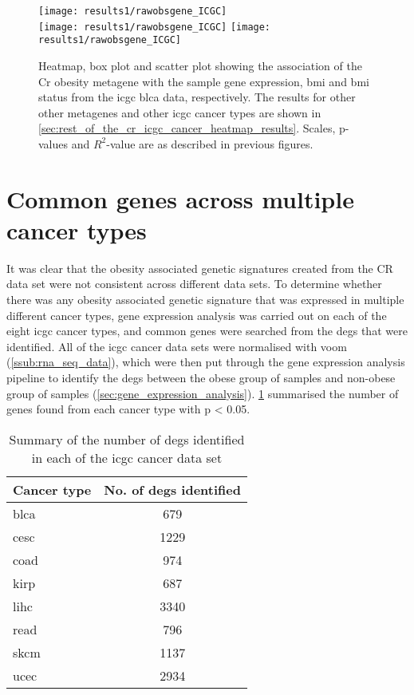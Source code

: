 \begin{figure}[htp!]
	\centering
	\texttt{[image: results1/rawobsgene\_ICGC]}\\
	\vspace{1em}
	\texttt{[image: results1/rawobsgene\_ICGC]}
	\hfill
	\texttt{[image: results1/rawobsgene\_ICGC]}
	\caption[Cr obesity metagene in the \acrshort{icgc} \acrshort{blca} data]{Heatmap, box plot and scatter plot showing the association of the Cr obesity metagene with the sample gene expression, \gls{bmi} and \gls{bmi} status from the \acrshort{icgc} \acrshort{blca} data, respectively.
	The results for other other metagenes and other \gls{icgc} cancer types are shown in \cref{sec:rest_of_the_cr_icgc_cancer_heatmap_results}.
	Scales, p-values and $R^2$-value are as described in previous figures.}
	\label{fig:degmetaicgc}
\end{figure}

\section{Common genes across multiple cancer types}
\label{sec:common_genes_across_multiple_cancer_types}

It was clear that the obesity associated genetic signatures created from the CR data set were not consistent across different data sets.
To determine whether there was any obesity associated genetic signature that was expressed in multiple different cancer types, gene expression analysis was carried out on each of the eight \gls{icgc} cancer types, and common genes were searched from the \glspl{deg} that were identified.
All of the \gls{icgc} cancer data sets were normalised with voom (\cref{ssub:rna_seq_data}), which were then put through the gene expression analysis pipeline to identify the \glspl{deg} between the obese group of samples and non-obese group of samples (\cref{sec:gene_expression_analysis}).
\cref{tab:icgcdegnum} summarised the number of genes found from each cancer type with p \textless{} 0.05.

\begin{table}[htbp]
	\centering
	\caption{Summary of the number of \glspl{deg} identified in each of the \gls{icgc} cancer data set}
	\label{tab:icgcdegnum}
	\begin{tabular}{lc}
		Cancer type & No. of \glspl{deg} identified\\
		\hline
		\hline
		\rule{0pt}{2.25ex}\gls{blca} & 679 \\
		\gls{cesc} & 1229\\
		\gls{coad} & 974\\
		\gls{kirp} & 687\\
		\gls{lihc} & 3340\\
		\gls{read} & 796\\
		\gls{skcm} & 1137\\
		\gls{ucec} & 2934\\
		\hline
		\hline
	\end{tabular}
\end{table}

